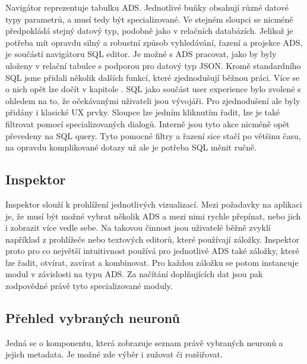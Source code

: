 Navigátor reprezentuje tabulku ADS. Jednotlivé buňky obsahují různé datové typy parametrů, a musí tedy být specializované. Ve stejném sloupci se nicméně předpokládá stejný datový typ, podobně jako v relačních databázích. Jelikož je potřeba mít opravdu silný a robustní způsob vyhledávání, řazení a projekce ADS, je součástí navigátoru SQL editor. Je možné s ADS pracovat, jako by byly uloženy v relační tabulce s podporou pro datový typ JSON. Kromě standardního SQL jsme přidali několik dalších funkcí, které zjednodušují běžnou práci. Více se o nich opět lze dočít v kapitole . SQL jako součást user experience bylo zvolené s ohledem na to, že očekávanými uživateli jsou vývojáři. Pro zjednodušení ale byly přidány i klasické UX prvky. Sloupce lze jedním kliknutím řadit, lze je také filtrovat pomocí specializovaných dialogů. Interně jsou tyto akce nicméně opět převedeny na SQL query. Tyto pomocné filtry a řazení sice stačí po většinu času, na opravdu komplikované dotazy už ale je potřeba SQL měnit ručně.

\subsection{Inspektor}

Inspektor slouží k prohlížení jednotlivých vizualizací. Mezi požadavky na aplikaci je, že musí být možné vybrat několik ADS a mezi nimi rychle přepínat, nebo jich i zobrazit více vedle sebe. Na takovou činnost jsou uživatelé běžně zvyklí například z prohlížeče nebo textových editorů, které používají záložky. Inspektor proto pro co největší intuitivnost používá pro jednotlivé ADS také záložky, které lze řadit, otvírat, zavírat a kombinovat. Pro každou záložku se potom instancuje modul v závislosti na typu ADS. Za načítání doplňujících dat jsou pak zodpovědné právě tyto specializované moduly. 

\subsection{Přehled vybraných neuronů}

Jedná se o komponentu, která zobrazuje seznam právě vybraných neuronů a jejich metadata. Je možné zde výběr i zužovat či rozšiřovat.

